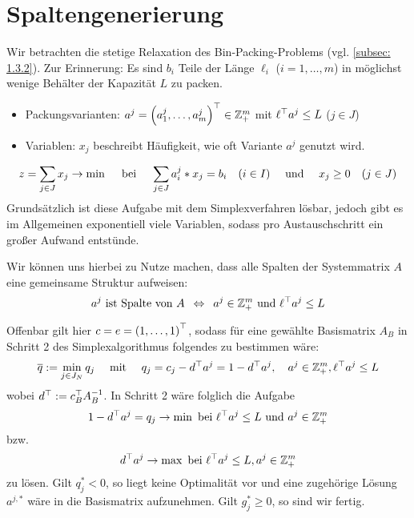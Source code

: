 \section{Spaltengenerierung}

Wir betrachten die stetige Relaxation des Bin-Packing-Problems (vgl. \cref{subsec: 1.3.2}). Zur Erinnerung: Es sind $b_i$ Teile der Länge $\ell_i$ ($i = 1, \dots, m$) in möglichst wenige Behälter der Kapazität $L$ zu packen. 
\begin{itemize}[nolistsep, topsep=-\parskip]
	\item Packungsvarianten: $a^j = \left( a_1^j , \dots , a_m^j \right)^{\top} \in \mathbb{Z}_+^m$ mit $\ell^{\top}a^j \le L$ ($j \in J$)
	\item Variablen: $x_j$ beschreibt Häufigkeit, wie oft Variante $a^j$ genutzt wird.
\end{itemize}
\begin{equation*}
	z = \sum_{j \in  J} x_j \to \min \quad \text{ bei } \quad \sum_{j \in J} a_i^j * x_j = b_i \quad (i \in I) \quad \text{ und } \quad x_j \ge 0 \quad (j \in J)
\end{equation*}
Grundsätzlich ist diese Aufgabe mit dem Simplexverfahren lösbar, jedoch gibt es im Allgemeinen exponentiell viele Variablen, sodass pro Austauschschritt ein großer Aufwand entstünde.

Wir können uns hierbei zu Nutze machen, dass alle Spalten der Systemmatrix $A$ eine gemeinsame Struktur aufweisen:
\begin{equation*}
	a^j \text{ ist Spalte von } A \enskip \Leftrightarrow \enskip a^j \in \mathbb{Z}_+^m \text{ und } \ell^{\top} a^j \le L
\end{equation*}

Offenbar gilt hier $c = e = \left( 1, \dots, 1 \right)^{\top}$, sodass für eine gewählte Basismatrix $A_B$ in Schritt 2 des Simplexalgorithmus folgendes zu bestimmen wäre:
\begin{equation*}
	\overline{q} \mathrel{:=} \min_{j \in J_N} q_j \quad \text{ mit } \quad q_j = c_j - d^{\top} a^j = 1 - d^{\top}a^j, \quad a^j \in \mathbb{Z}_+^m, \ell^{\top} a^j \le L
\end{equation*}
wobei $d^{\top} \mathrel{:=} c_B^{\top} A_B^{-1}$. In Schritt 2 wäre folglich die Aufgabe 
\begin{equation*}
	1 - d^{\top} a^j = q_j \to \min \text{ bei } \ell^{\top} a^j \le L \text{ und } a^j \in \mathbb{Z}_+^m
\end{equation*}
bzw. 
\begin{equation*}
	d^{\top} a^j \to \max \text{ bei } \ell^{\top} a^j \le L, a^j \in \mathbb{Z}_+^m
\end{equation*}
zu lösen.
Gilt $q_j^\ast < 0$, so liegt keine Optimalität vor und eine zugehörige Lösung $a^{j, \ast}$ wäre in die Basismatrix aufzunehmen. Gilt $g_j^\ast \ge 0$, so sind wir fertig.